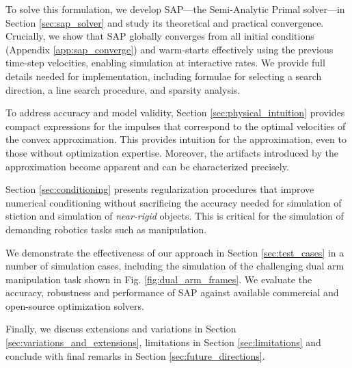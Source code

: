 To solve this formulation, we develop SAP---the Semi-Analytic Primal solver---in
Section \ref{sec:sap_solver} and study its theoretical and practical
convergence.  Crucially, we show that SAP globally converges from all initial
conditions (Appendix \ref{app:sap_converge}) and warm-starts effectively using
the previous time-step velocities, enabling simulation at interactive rates. We
provide full details needed for implementation, including formulae for selecting
a search direction, a line search procedure, and sparsity analysis. 

To address accuracy and model validity,
Section \ref{sec:physical_intuition} provides compact expressions for the
impulses that correspond to the optimal velocities of the convex approximation.
This provides intuition for the approximation, even to those without
optimization expertise. Moreover, the artifacts introduced by the approximation
become apparent and can be characterized precisely. 

Section \ref{sec:conditioning} presents regularization
procedures that improve numerical conditioning without sacrificing the accuracy
needed for simulation of stiction and simulation of \emph{near-rigid} objects.
This is critical for the simulation of demanding robotics tasks such as
manipulation. 

We demonstrate the effectiveness of our approach in Section \ref{sec:test_cases}
in a number of simulation cases, including the simulation of the challenging
dual arm manipulation task shown in Fig. \ref{fig:dual_arm_frames}. We evaluate
the accuracy, robustness and performance of SAP against available commercial and
open-source optimization solvers.

Finally, we discuss extensions and variations in Section
\ref{sec:variations_and_extensions}, limitations in Section
\ref{sec:limitations} and conclude with final remarks in Section
\ref{sec:future_directions}.
